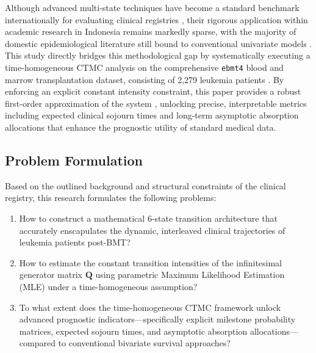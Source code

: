 \documentclass[9pt,a4paper,twocolumn,twoside]{rho-class/rho}
\begin{document}
    Although advanced multi-state techniques have become a standard benchmark internationally for evaluating clinical registries \cite{dewreede2011mstate}, their rigorous application within academic research in Indonesia remains markedly sparse, with the majority of domestic epidemiological literature still bound to conventional univariate models \cite{KemenKes2023}. This study directly bridges this methodological gap by systematically executing a time-homogeneous CTMC analysis on the comprehensive \texttt{ebmt4} blood and marrow transplantation dataset, consisting of 2,279 leukemia patients \cite{deWreede2010}. By enforcing an explicit constant intensity constraint, this paper provides a robust first-order approximation of the system \cite{KalbfleischLawless1985}, unlocking precise, interpretable metrics including expected clinical sojourn times and long-term asymptotic absorption allocations that enhance the prognostic utility of standard medical data.

    \subsection{Problem Formulation}
    Based on the outlined background and structural constraints of the clinical registry, this research formulates the following problems:
    \begin{enumerate}
        \item How to construct a mathematical 6-state transition architecture that accurately enscapulates the dynamic, interleaved clinical trajectories of leukemia patients post-BMT?
            
        \item How to estimate the constant transition intensities of the infinitesimal generator matrix $\mathbf{Q}$ using parametric Maximum Likelihood Estimation (MLE) under a time-homogeneous assumption?
        
        \item To what extent does the time-homogeneous CTMC framework unlock advanced prognostic indicators—specifically explicit milestone probability matrices, expected sojourn times, and asymptotic absorption allocations—compared to conventional bivariate survival approaches?
    \end{enumerate}
        
\end{document}
